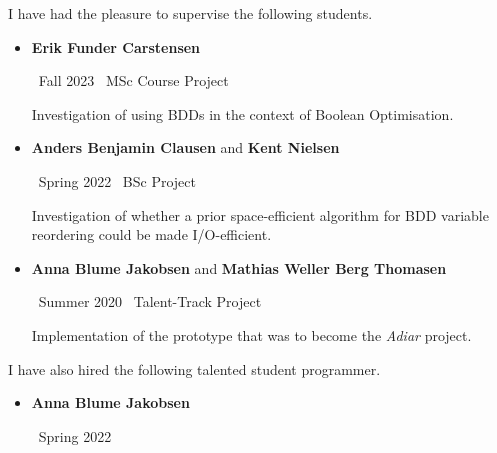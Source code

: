 
I have had the pleasure to supervise the following students.

\medskip

\begin{itemize}
\item {\color{accent} \textbf{Erik Funder Carstensen}}

  \smallskip

  \faCalendar\ Fall 2023 \hspace{101pt} \faGraduationCap\ MSc Course Project

  \medskip

  Investigation of using BDDs in the context of Boolean Optimisation.

  \medskip

\item {\color{accent} \textbf{Anders Benjamin Clausen} and \textbf{Kent Nielsen}}

  \smallskip

  \faCalendar\ Spring 2022 \hspace{90pt} \faGraduationCap\ BSc Project

  \medskip

  Investigation of whether a prior space-efficient algorithm for BDD variable
  reordering could be made I/O-efficient.

  \medskip

\item {\color{accent} \textbf{Anna Blume Jakobsen} and \textbf{Mathias Weller Berg Thomasen}}

  \smallskip

  \faCalendar\ Summer 2020 \hspace{82pt} \faGraduationCap\ Talent-Track Project

  \medskip

  Implementation of the prototype that was to become the \emph{Adiar} project.
\end{itemize}

\smallskip

I have also hired the following talented student programmer.

\medskip

\begin{itemize}
\item {\color{accent} \textbf{Anna Blume Jakobsen}}

  \smallskip

  \faCalendar \ Spring 2022
\end{itemize}
